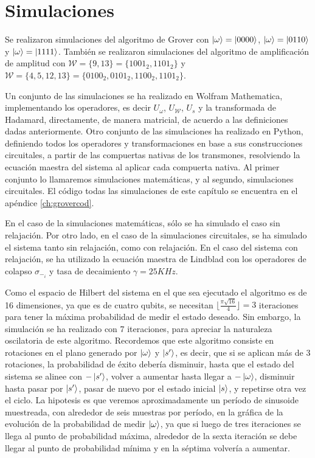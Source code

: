 \section{Simulaciones}

Se realizaron simulaciones del algoritmo de Grover con $\ket{\omega} = \ket{0000}$, $\ket{\omega} = \ket{0110}$ y $\ket{\omega} = \ket{1111}$. También se realizaron simulaciones del algoritmo de amplificación de amplitud con $\mathcal{W} = \{9, 13\} = \{1001_2, 1101_2 \}$ y $\mathcal{W} = \{4, 5, 12, 13\} = \{0100_2, 0101_2, 1100_2, 1101_2\}$.

Un conjunto de las simulaciones se ha realizado en Wolfram Mathematica, implementando los operadores, es decir $U_{\omega}$, $U_\mathcal{W}$, $U_s$ y la transformada de Hadamard, directamente, de manera matricial, de acuerdo a las definiciones dadas anteriormente. Otro conjunto de las simulaciones ha realizado en Python, definiendo todos los operadores y transformaciones en base a sus construcciones circuitales, a partir de las compuertas nativas de los transmones, resolviendo la ecuación maestra del sistema al aplicar cada compuerta nativa. Al primer conjunto lo llamaremos simulaciones matemáticas, y al segundo, simulaciones circuitales. El código todas las simulaciones de este capítulo se encuentra en el apéndice \ref{ch:grovercod}.

En el caso de la simulaciones matemáticas, sólo se ha simulado el caso sin relajación. Por otro lado, en el caso de la simulaciones circuitales, se ha simulado el sistema tanto sin relajación, como con relajación. En el caso del sistema con relajación, se ha utilizado la ecuación maestra de Lindblad con los operadores de colapso $\sigma_{-_i}$ y tasa de decaimiento $\gamma = 25KHz$.

Como el espacio de Hilbert del sistema en el que sea ejecutado el algoritmo es de 16 dimensiones, ya que es de cuatro qubits, se necesitan $\lfloor \frac{\pi \sqrt{16}}{4} \rfloor = 3$ iteraciones para tener la máxima probabilidad de medir el estado deseado. Sin embargo, la simulación se ha realizado con 7 iteraciones, para apreciar la naturaleza oscilatoria de este algoritmo. Recordemos que este algoritmo consiste en rotaciones en el plano generado por $\ket{\omega}$ y $\ket{s^\prime}$, es decir, que si se aplican más de 3 rotaciones, la probabilidad de éxito debería disminuir, hasta que el estado del sistema se alinee con $- \ket{s^\prime}$, volver a aumentar hasta llegar a $- \ket{\omega}$, disminuir hasta pasar por $\ket{s^\prime}$, pasar de nuevo por el estado inicial $\ket{s}$, y repetirse otra vez el ciclo. La hipotesis es que veremos aproximadamente un período de sinusoide muestreada, con alrededor de seis muestras por período, en la gráfica de la evolución de la probabilidad de medir $\ket{\omega}$, ya que si luego de tres iteraciones se llega al punto de probabilidad máxima, alrededor de la sexta iteración se debe llegar al punto de probabilidad mínima y en la séptima volvería a aumentar.

